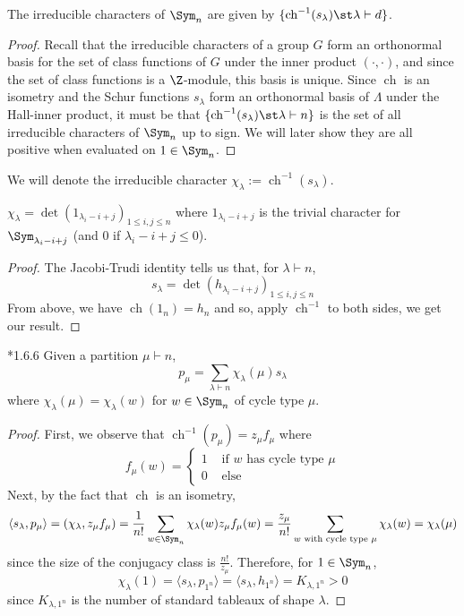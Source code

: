 \documentclass[11pt,leqno,oneside]{amsart}
\numberwithin{thm}{section}
\newcommand{\partitionof}{\vdash}
\newcommand{\sym}{\Lambda}
\newcommand{\ch}{\operatorname{ch}}
\begin{document}
\begin{prop}
  The irreducible characters of \(\Sym_n\) are given by
  \(\{\ch^{-1}(s_\lambda) \st \lambda \partitionof d\}\). 
\end{prop}
\begin{proof}
  Recall that the irreducible characters of a group \(G\) form an
  orthonormal basis for the set of class functions of \(G\) under the
  inner product \((\cdot, \cdot)\), and since the set of class
  functions is a \(\Z\)-module, this basis is unique. Since \(\ch\) is
  an isometry and 
  the Schur functions \(s_\lambda\) form an orthonormal basis of
  \(\sym\) under the Hall-inner product, it must be that
  \(\{\ch^{-1}(s_\lambda) \st \lambda \partitionof n\}\) is the set of
  all irreducible characters of \(\Sym_n\) up to sign. We will later
  show they are all
  positive when evaluated on \(1 \in \Sym_n\).
\end{proof}
\begin{defn}
  We will denote the irreducible character \(\chi_\lambda :=
  \ch^{-1}(s_\lambda)\). 
\end{defn}
\begin{prop}
  \(\chi_\lambda = \det(1_{\lambda_i-i+j})_{1 \leq i,j \leq
    n}\) where \(1_{\lambda_i-i+j}\) is the trivial character
  for \(\Sym_{\lambda_i-i+j}\) (and \(0\) if \(\lambda_i-i+j \leq 0\)).
\end{prop}
\begin{proof}
  The Jacobi-Trudi identity tells us that, for \(\lambda \partitionof
  n\),
  \[
    s_\lambda = \det(h_{\lambda_i-i+j})_{1 \leq i,j \leq n}
  \]
  From above, we have \(\ch(1_n) = h_n\) and so, apply
  \(\ch^{-1}\) to both sides, we get our result.
\end{proof}
\begin{thm}
  \cite{manivel}*{1.6.6} Given a partition \(\mu \partitionof n\), \[
    p_\mu = \sum_{\lambda \partitionof n} \chi_\lambda(\mu) s_\lambda
  \]
  where \(\chi_\lambda(\mu) = \chi_\lambda(w)\) for \(w \in \Sym_n\)
  of cycle type \(\mu\).
\end{thm}
\begin{proof}
  First, we observe that \(\ch^{-1}(p_\mu) = z_\mu f_\mu\) where \[
    f_\mu(w) =
    \begin{cases}
      1 & \text{ if }w\text{ has cycle type }\mu\\
      0 & \text{ else}
    \end{cases}
  \]
  Next, by the fact that \(\ch\) is an isometry, \[
    \langle s_\lambda, p_\mu \rangle = (\chi_\lambda, z_\mu f_\mu) =
    \frac{1}{n!}\sum_{w \in \Sym_n} \chi_\lambda(w) z_\mu f_\mu(w) =
    \frac{z_\mu}{n!} \sum_{w \text{ with cycle type }\mu}
    \chi_\lambda(w) = \chi_\lambda(\mu)
  \]
  since the size of the conjugacy class is
  \(\frac{n!}{z_\mu}\). Therefore, for \(1 \in \Sym_n\), \[
    \chi_\lambda(1) = \langle s_\lambda, p_{1^n} \rangle = \langle
    s_\lambda, h_{1^n} \rangle = K_{\lambda,1^n} > 0
  \]
  since \(K_{\lambda,1^n}\) is the number of standard tableaux of
  shape \(\lambda\).
\end{proof}
\end{document}
